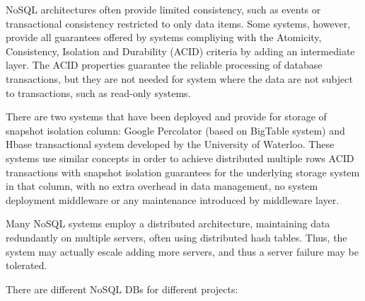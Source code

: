 NoSQL architectures often provide limited consistency, such as events or transactional consistency restricted to only data items. Some systems, however, provide all guarantees offered by
systems compliying with the Atomicity, Consistency, Isolation and Durability (ACID) criteria
by adding an intermediate layer.
The ACID properties guarantee the reliable processing of database transactions, but they are not needed for system where the data are not subject to transactions, such as read-only systems.

There are two systems that have been deployed and provide for storage of snapshot isolation column: Google Percolator (based on BigTable system) and Hbase transactional system developed by the University of Waterloo. These systems use similar concepts in order to achieve distributed multiple rows ACID transactions with snapshot isolation guarantees for the underlying storage system in that column,
with %
no extra overhead in data management, no system deployment middleware or any maintenance introduced by middleware layer. 

Many %
NoSQL systems employ a distributed architecture, maintaining data redundantly on multiple servers, often using distributed hash tables. Thus, the system may actually escale adding more servers, and thus a server failure may be tolerated. 

There are different NoSQL DBs for different projects:

